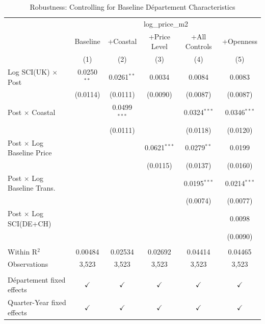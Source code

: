 
\begin{table}[htbp]
   \caption{\label{tab:baseline_controls} Robustness: Controlling for Baseline D\'epartement Characteristics}
   \bigskip
   \centering
   \begin{tabular}{lccccc}
      \toprule
       & \multicolumn{5}{c}{log\_price\_m2}\\
                                         & Baseline      & +Coastal       & +Price Level   & +All Controls  & +Openness \\   
                                         & (1)           & (2)            & (3)            & (4)            & (5)\\  
      \midrule 
      Log SCI(UK) $\times$ Post          & 0.0250$^{**}$ & 0.0261$^{**}$  & 0.0034         & 0.0084         & 0.0083\\   
                                         & (0.0114)      & (0.0111)       & (0.0090)       & (0.0087)       & (0.0087)\\   
      Post $\times$ Coastal              &               & 0.0499$^{***}$ &                & 0.0324$^{***}$ & 0.0346$^{***}$\\   
                                         &               & (0.0111)       &                & (0.0118)       & (0.0120)\\   
      Post $\times$ Log Baseline Price   &               &                & 0.0621$^{***}$ & 0.0279$^{**}$  & 0.0199\\   
                                         &               &                & (0.0115)       & (0.0137)       & (0.0160)\\   
      Post $\times$ Log Baseline Trans.  &               &                &                & 0.0195$^{***}$ & 0.0214$^{***}$\\   
                                         &               &                &                & (0.0074)       & (0.0077)\\   
      Post $\times$ Log SCI(DE+CH)       &               &                &                &                & 0.0098\\   
                                         &               &                &                &                & (0.0090)\\   
       \\
      Within R$^2$                       & 0.00484       & 0.02534        & 0.02692        & 0.04414        & 0.04465\\  
      Observations                       & 3,523         & 3,523          & 3,523          & 3,523          & 3,523\\  
       \\
      D\'epartement fixed effects        & $\checkmark$  & $\checkmark$   & $\checkmark$   & $\checkmark$   & $\checkmark$\\   
      Quarter-Year fixed effects         & $\checkmark$  & $\checkmark$   & $\checkmark$   & $\checkmark$   & $\checkmark$\\   
      \bottomrule
   \end{tabular}
\end{table}


